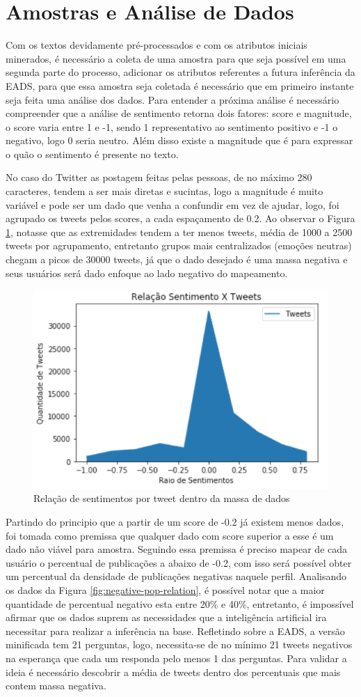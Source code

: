\section{Amostras e Análise de Dados}
Com os textos devidamente pré-processados e com os atributos iniciais minerados, é necessário a coleta de uma amostra para que seja possível em uma segunda parte do processo, adicionar os atributos referentes a futura inferência da EADS, para que essa amostra seja coletada é necessário que em primeiro instante seja feita uma análise dos dados. Para entender a próxima análise é necessário compreender que a análise de sentimento retorna dois fatores: score e magnitude, o score varia entre 1 e -1, sendo 1 representativo ao sentimento positivo e -1 o negativo, logo 0 seria neutro. Além disso existe a magnitude que é para expressar o quão o sentimento é presente no texto. 

No caso do Twitter as postagem feitas pelas pessoas, de no máximo 280 caracteres, tendem a ser mais diretas e sucintas, logo a magnitude é muito variável e pode ser um dado que venha a confundir em vez de ajudar, logo, foi agrupado os tweets pelos scores, a cada espaçamento de 0.2. Ao observar o Figura \ref{fig:sentiment-relation}, notasse que as extremidades tendem a ter menos tweets, média de 1000 a 2500 tweets por agrupamento, entretanto grupos mais centralizados (emoções neutras) chegam a picos de 30000 tweets, já que o dado desejado é uma massa negativa e seus usuários será dado enfoque ao lado negativo do mapeamento.

\begin{figure}[!ht]
    \centering
    \includegraphics[width=.4\textwidth]{imagens/relacao-sentimento.png}
    \caption{Relação de sentimentos por tweet dentro da massa de dados}
    \label{fig:sentiment-relation}
\end{figure}


Partindo do principio que a partir de um score de -0.2 já existem menos dados, foi tomada como premissa que qualquer dado com score superior a esse é um dado não viável para amostra. Seguindo essa premissa é preciso mapear de cada usuário o percentual de publicações a abaixo de -0.2, com isso será possível obter um percentual da densidade de publicações negativas naquele perfil. Analisando os dados da Figura \ref{fig:negative-pop-relation}, é possível notar que a maior quantidade de percentual negativo esta entre 20\% e 40\%, entretanto, é impossível afirmar que os dados suprem as necessidades que a inteligência artificial ira necessitar para realizar a inferência na base. Refletindo sobre a EADS, a versão minificada tem 21 perguntas, logo, necessita-se de no mínimo 21 tweets negativos na esperança que cada um responda pelo menos 1 das perguntas. Para validar a ideia é necessário descobrir a média de tweets dentro dos percentuais que mais contem massa negativa.

